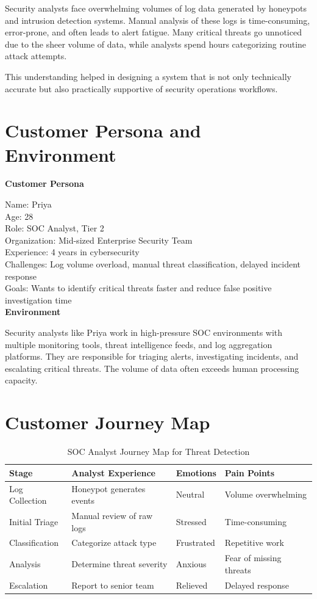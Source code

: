 \documentclass[12pt,a4paper]{report}
\begin{document}
Security analysts face overwhelming volumes of log data generated by honeypots and intrusion detection systems. Manual analysis of these logs is time-consuming, error-prone, and often leads to alert fatigue. Many critical threats go unnoticed due to the sheer volume of data, while analysts spend hours categorizing routine attack attempts.

This understanding helped in designing a system that is not only technically accurate but also practically supportive of security operations workflows.

\section{Customer Persona and Environment}

\textbf{Customer Persona}

Name: Priya \\
Age: 28 \\
Role: SOC Analyst, Tier 2 \\
Organization: Mid-sized Enterprise Security Team \\
Experience: 4 years in cybersecurity \\
Challenges: Log volume overload, manual threat classification, delayed incident response \\
Goals: Wants to identify critical threats faster and reduce false positive investigation time \\

\textbf{Environment}

Security analysts like Priya work in high-pressure SOC environments with multiple monitoring tools, threat intelligence feeds, and log aggregation platforms. They are responsible for triaging alerts, investigating incidents, and escalating critical threats. The volume of data often exceeds human processing capacity.

\section{Customer Journey Map}

\begin{table}[h]
\centering
\caption{SOC Analyst Journey Map for Threat Detection}
\begin{tabular}{|l|l|l|l|}
\hline
\textbf{Stage} & \textbf{Analyst Experience} & \textbf{Emotions} & \textbf{Pain Points} \\
\hline
Log Collection & Honeypot generates events & Neutral & Volume overwhelming \\
Initial Triage & Manual review of raw logs & Stressed & Time-consuming \\
Classification & Categorize attack type & Frustrated & Repetitive work \\
Analysis & Determine threat severity & Anxious & Fear of missing threats \\
Escalation & Report to senior team & Relieved & Delayed response \\
\hline
\end{tabular}
\end{table}
\end{document}
